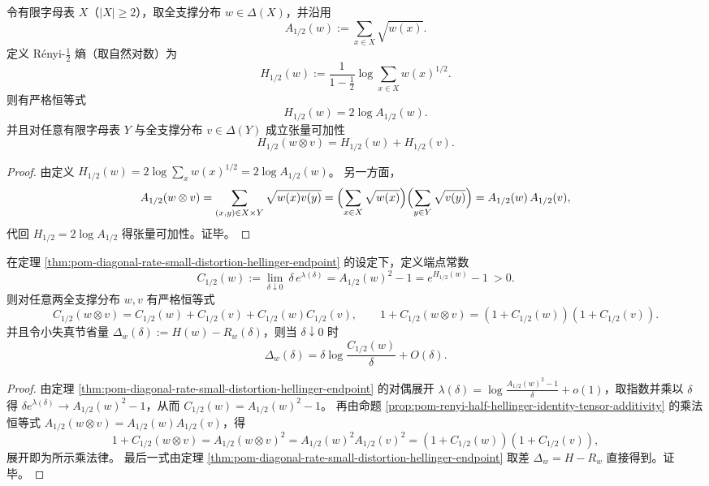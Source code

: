 \begin{proposition}\label{prop:pom-renyi-half-hellinger-identity-tensor-additivity}
令有限字母表 \(X\)（\(|X|\ge 2\)），取全支撑分布 \(w\in\Delta(X)\)，并沿用
\[
A_{1/2}(w):=\sum_{x\in X}\sqrt{w(x)}.
\]
定义 Rényi-\(\tfrac12\) 熵（取自然对数）为
\[
H_{1/2}(w):=\frac{1}{1-\tfrac12}\log\sum_{x\in X}w(x)^{1/2}.
\]
则有严格恒等式
\[
H_{1/2}(w)=2\log A_{1/2}(w).
\]
并且对任意有限字母表 \(Y\) 与全支撑分布 \(v\in\Delta(Y)\) 成立张量可加性
\[
H_{1/2}(w\otimes v)=H_{1/2}(w)+H_{1/2}(v).
\]
\end{proposition}
\begin{proof}
由定义
\(
H_{1/2}(w)=2\log\sum_x w(x)^{1/2}=2\log A_{1/2}(w)
\)。
另一方面，
\[
A_{1/2}(w\otimes v)
=\sum_{(x,y)\in X\times Y}\sqrt{w(x)v(y)}
=\Bigl(\sum_{x\in X}\sqrt{w(x)}\Bigr)\Bigl(\sum_{y\in Y}\sqrt{v(y)}\Bigr)
=A_{1/2}(w)\,A_{1/2}(v),
\]
代回 \(H_{1/2}=2\log A_{1/2}\) 得张量可加性。证毕。
\end{proof}

\begin{corollary}\label{cor:pom-small-distortion-constant-tensor-multiplicative}
在定理 \ref{thm:pom-diagonal-rate-small-distortion-hellinger-endpoint} 的设定下，定义端点常数
\[
C_{1/2}(w):=\lim_{\delta\downarrow 0}\ \delta\,e^{\lambda(\delta)}
=A_{1/2}(w)^2-1
=e^{H_{1/2}(w)}-1\ >0.
\]
则对任意两全支撑分布 \(w,v\) 有严格恒等式
\[
C_{1/2}(w\otimes v)=C_{1/2}(w)+C_{1/2}(v)+C_{1/2}(w)C_{1/2}(v),
\qquad
1+C_{1/2}(w\otimes v)=(1+C_{1/2}(w))(1+C_{1/2}(v)).
\]
并且令小失真节省量 \(\Delta_w(\delta):=H(w)-R_w(\delta)\)，则当 \(\delta\downarrow 0\) 时
\[
\Delta_w(\delta)=\delta\log\frac{C_{1/2}(w)}{\delta}+O(\delta).
\]
\end{corollary}
\begin{proof}
由定理 \ref{thm:pom-diagonal-rate-small-distortion-hellinger-endpoint} 的对偶展开 \(\lambda(\delta)=\log\frac{A_{1/2}(w)^2-1}{\delta}+o(1)\)，取指数并乘以 \(\delta\) 得
\(
\delta e^{\lambda(\delta)}\to A_{1/2}(w)^2-1
\)，从而 \(C_{1/2}(w)=A_{1/2}(w)^2-1\)。
再由命题 \ref{prop:pom-renyi-half-hellinger-identity-tensor-additivity} 的乘法恒等式 \(A_{1/2}(w\otimes v)=A_{1/2}(w)A_{1/2}(v)\)，得
\[
1+C_{1/2}(w\otimes v)=A_{1/2}(w\otimes v)^2=A_{1/2}(w)^2A_{1/2}(v)^2=(1+C_{1/2}(w))(1+C_{1/2}(v)),
\]
展开即为所示乘法律。
最后一式由定理 \ref{thm:pom-diagonal-rate-small-distortion-hellinger-endpoint} 取差 \(\Delta_w=H-R_w\) 直接得到。证毕。
\end{proof}

